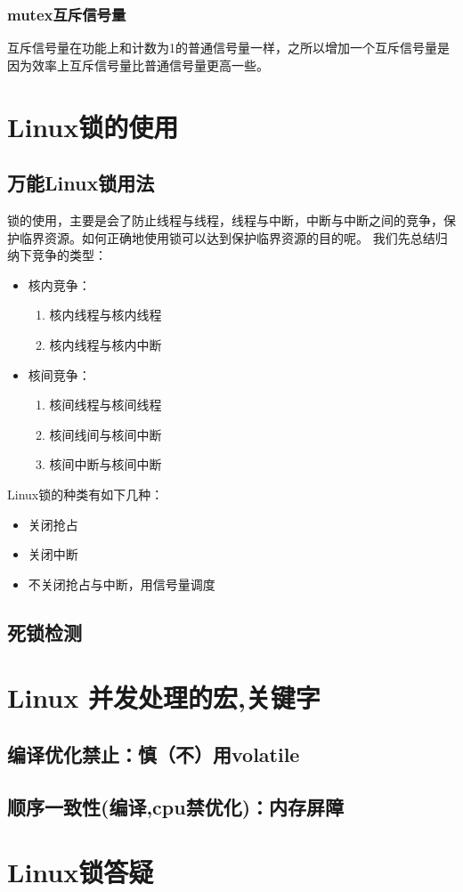 \subsection{mutex互斥信号量}
互斥信号量在功能上和计数为1的普通信号量一样，之所以增加一个互斥信号量是因为效率上互斥信号量比普通信号量更高一些。
\chapter{Linux锁的使用}
\section{万能Linux锁用法}
锁的使用，主要是会了防止线程与线程，线程与中断，中断与中断之间的竞争，保护临界资源。如何正确地使用锁可以达到保护临界资源的目的呢。
我们先总结归纳下竞争的类型：
\begin{itemize}
  \item 核内竞争：\begin{enumerate}
               \item 核内线程与核内线程
               \item 核内线程与核内中断               
             \end{enumerate}
  \item 核间竞争：\begin{enumerate}
               \item 核间线程与核间线程
               \item 核间线间与核间中断
               \item 核间中断与核间中断
             \end{enumerate}
\end{itemize}
Linux锁的种类有如下几种：
\begin{itemize}
  \item 关闭抢占
  \item 关闭中断
  \item 不关闭抢占与中断，用信号量调度
\end{itemize}

\section{死锁检测}

\chapter{Linux 并发处理的宏,关键字}
\section{编译优化禁止：慎（不）用volatile}

\section{顺序一致性(编译,cpu禁优化)：内存屏障}
\chapter{Linux锁答疑}
